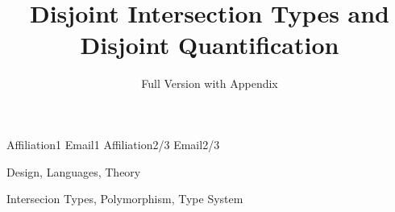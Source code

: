 \documentclass[preprint,9pt]{sigplanconf}
\begin{document}


\preprintfooter{\name}                        %

\title{Disjoint Intersection Types and Disjoint Quantification}
\subtitle{Full Version with Appendix}

           {Affiliation1}
           {Email1}
           {Affiliation2/3}
           {Email2/3}

\maketitle

\begin{abstract}
  
\end{abstract}


\terms Design, Languages, Theory

\keywords Intersecion Types, Polymorphism, Type System










\newpage



\clearpage
\onecolumn

\appendix


\end{document}
